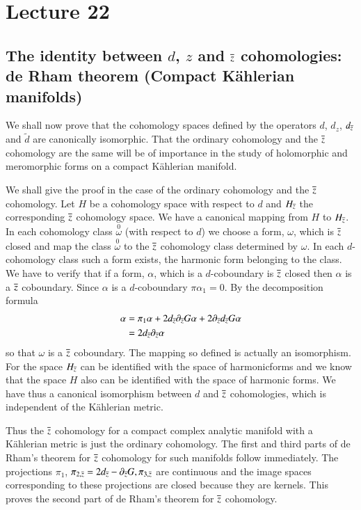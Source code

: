 \chapter{Lecture 22}

\section*{The identity between $d$, $z$ and $\overline{z}$ cohomologies: de
  Rham theorem (Compact K\"ahlerian manifolds)}\pageoriginale

We shall now prove that the cohomology spaces defined by the operators
$d$, $d_{z}$, $d_{\overline{z}}$ and $\widetilde{d}$ are canonically
isomorphic. That the ordinary cohomology and the $\overline{z}$ cohomology
are the same will be of importance in the study of holomorphic and
meromorphic forms on a compact K\"ahlerian manifold.

We shall give the proof in the case of the ordinary cohomology and the
$\overline{z}$ cohomology. Let $H$ be a cohomology space with respect to $d$
and $H_{\overline{z}}$ the corresponding $\overline{z}$ cohomology space. We have
a canonical mapping from $H$ to $H_{\overline{z}}$. In each cohomology class
$\overset{0}{\omega}$ (with respect to $d$) we choose a form,
$\omega$, which is $\overline{z}$ closed and map the class
$\overset{0}{\omega}$ to the $\overline{z}$ cohomology class determined by
$\omega$. In each $d$-cohomology class such a form exists, the
harmonic form belonging to the class. We have to verify that if a
form, $\alpha$, which is a $d$-coboundary is $\overline{z}$ closed then
$\alpha$ is a $\overline{z}$ coboundary. Since $\alpha$ is a $d$-coboundary
$\pi \alpha_1=0$. By the decomposition formula
\begin{align*}
\alpha &=
\pi_{1}\alpha+2d_{\overline{z}}\partial_{\overline{z}}G\alpha+2\partial_{\overline{z}}d_{\overline{z}}G\alpha\\ 
&= 2d_{\overline{z}}\partial_{\overline{z}}\alpha
\end{align*}
so that $\omega$ is a $\overline{z}$ coboundary. The mapping so defined is
actually an isomorphism. For the space $H_{\overline{z}}$ can be identified
with the space of harmonic\pageoriginale forms and we know that the
space $H$ also can be identified with the space of harmonic forms. We
have thus a canonical isomorphism between $d$ and $\overline{z}$
cohomologies, which is independent of the K\"ahlerian metric.

Thus the $\overline{z}$ cohomology for a compact complex analytic manifold
with a K\"ahlerian metric is just the ordinary cohomology. The first
and third parts of de Rham's theorem for $\overline{z}$ cohomology for such
manifolds follow immediately. The projections $\pi_{1}$,
$\pi_{2,\overline{z}}=2d_{\overline{z}}-\partial_{\overline{z}}G,\pi_{3,\overline{z}}$ are
continuous and the image spaces corresponding to these projections are
closed because they are kernels. This proves the second part of de
Rham's theorem for $\overline{z}$ cohomology.

